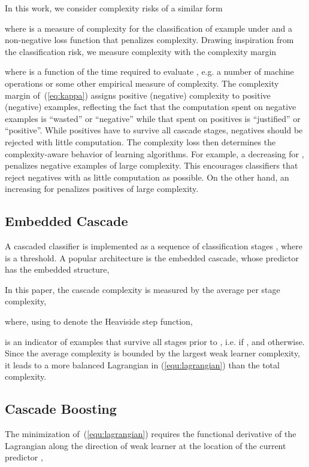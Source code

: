 \documentclass[10pt,twocolumn,letterpaper]{article}
\begin{document}
In this work, we consider complexity risks of a similar form

where  is a measure of complexity for the classification
of example  under  and  a non-negative
loss function
that penalizes complexity. Drawing inspiration from the classification
risk, we measure complexity with the complexity margin

where  is a function of the time required to
evaluate , e.g. a number of machine operations or some other
empirical measure of complexity. The complexity margin
of~(\ref{eq:kappa}) assigns positive (negative)
complexity to positive (negative) examples, reflecting the fact that
the computation spent on negative examples is ``wasted'' or
``negative'' while that spent on positives is ``justified'' or ``positive''.
While positives have to survive all cascade stages, negatives
should be rejected with little computation.
The complexity loss  then determines the complexity-aware behavior
of learning algorithms. For example, a decreasing
  for , penalizes negative
examples of large complexity. This encourages classifiers that reject
negatives with as little computation as possible.
On the other
hand, an increasing  for  penalizes positives
of large complexity.


\subsection{Embedded Cascade}

A cascaded classifier is implemented as a sequence of classification
stages , where  is a threshold. A
popular architecture is the embedded cascade, whose predictor has the embedded structure,

In this paper, the cascade complexity is measured by the average per stage complexity,

where, using  to denote the Heaviside step function,

is an indicator of examples that survive all stages
prior to , i.e.  if , and
 otherwise. Since the average complexity is bounded
by the largest weak learner complexity, it leads to a more balanced Lagrangian
in (\ref{equ:lagrangian}) than the total complexity.


\subsection{Cascade Boosting}

The minimization of~(\ref{equ:lagrangian}) requires the
functional derivative of the Lagrangian along the direction of weak
learner  at the location of the current predictor ,
\end{document}
